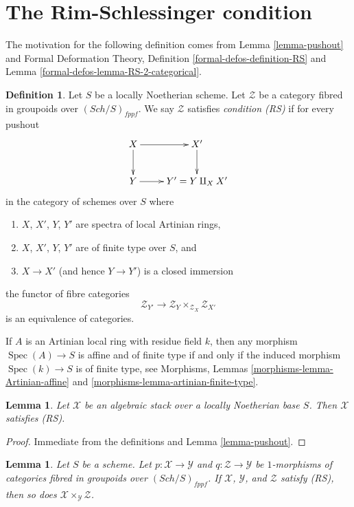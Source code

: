 \documentclass{stacks-project}
\theoremstyle{plain}
\newtheorem{lemma}[subsection]{Lemma}
\theoremstyle{definition}
\newtheorem{definition}[subsection]{Definition}
\theoremstyle{remark}
\numberwithin{equation}{subsection}
\def\Spec{\mathop{\mathrm{Spec}}}
\def\Sch{\mathit{Sch}}
\begin{document}
\section{The Rim-Schlessinger condition}
\label{section-RS}

\noindent
The motivation for the following definition comes from
Lemma \ref{lemma-pushout}
and
Formal Deformation Theory, Definition \ref{formal-defos-definition-RS} and
Lemma \ref{formal-defos-lemma-RS-2-categorical}.

\begin{definition}
\label{definition-RS}
Let $S$ be a locally Noetherian scheme. Let $\mathcal{Z}$ be a category
fibred in groupoids over $(\Sch/S)_{fppf}$. We say $\mathcal{Z}$
satisfies {\it condition (RS)} if for every pushout
$$
\xymatrix{
X \ar[r] \ar[d] & X' \ar[d] \\
Y \ar[r] & Y' = Y \amalg_X X'
}
$$
in the category of schemes over $S$ where
\begin{enumerate}
\item $X$, $X'$, $Y$, $Y'$ are spectra of local Artinian rings,
\item $X$, $X'$, $Y$, $Y'$ are of finite type over $S$, and
\item $X \to X'$ (and hence $Y \to Y'$) is a closed immersion
\end{enumerate}
the functor of fibre categories
$$
\mathcal{Z}_{Y'}
\longrightarrow
\mathcal{Z}_Y \times_{\mathcal{Z}_X} \mathcal{Z}_{X'}
$$
is an equivalence of categories.
\end{definition}

\noindent
If $A$ is an Artinian local ring with residue field $k$, then
any morphism $\Spec(A) \to S$ is affine and of finite type if and
only if the induced morphism $\Spec(k) \to S$ is of finite type, see
Morphisms, Lemmas \ref{morphisms-lemma-Artinian-affine} and
\ref{morphisms-lemma-artinian-finite-type}.

\begin{lemma}
\label{lemma-algebraic-stack-RS}
Let $\mathcal{X}$ be an algebraic stack over a locally Noetherian base
$S$. Then $\mathcal{X}$ satisfies (RS).
\end{lemma}

\begin{proof}
Immediate from the definitions and Lemma \ref{lemma-pushout}.
\end{proof}

\begin{lemma}
\label{lemma-fibre-product-RS}
Let $S$ be a scheme. Let $p : \mathcal{X} \to \mathcal{Y}$ and
$q : \mathcal{Z} \to \mathcal{Y}$ be $1$-morphisms of categories
fibred in groupoids over $(\Sch/S)_{fppf}$. If $\mathcal{X}$, $\mathcal{Y}$,
and $\mathcal{Z}$ satisfy (RS), then so
does $\mathcal{X} \times_\mathcal{Y} \mathcal{Z}$.
\end{lemma}
\end{document}
